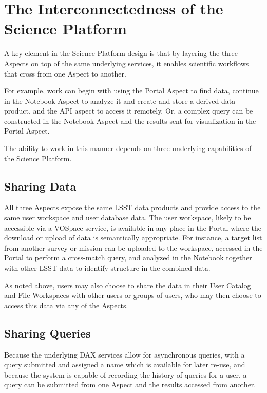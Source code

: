 \section{The Interconnectedness of the Science Platform}\label{interconnectedness-of-the-science-platform}

A key element in the Science Platform design is that by layering the three Aspects on top of the same underlying services, it enables scientific workflows that cross from one Aspect to another.

For example, work can begin with using the Portal Aspect to find data, continue in the Notebook Aspect to analyze it and create and store a derived data product, and the API aspect to access it remotely.
Or, a complex query can be constructed in the Notebook Aspect and the results sent for visualization in the Portal Aspect.

The ability to work in this manner depends on three underlying capabilities of the Science Platform.

\subsection{Sharing Data}\label{sharing-data}

All three Aspects expose the same LSST data products and provide access to the same user workspace and user database data.
The user workspace, likely to be accessible via a VOSpace service, is available in any place in the Portal where the download or upload of data is semantically appropriate.
For instance, a target list from another survey or mission can be uploaded to the workspace, accessed in the Portal to perform a cross-match query, and analyzed in the Notebook together with other LSST data to identify structure in the combined data.

As noted above, users may also choose to share the data in their User Catalog and File Workspaces with other users or groups of users, who may then choose to access this data via any of the Aspects.

\subsection{Sharing Queries}\label{sharing-queries}

Because the underlying DAX services allow for asynchronous queries, with a query submitted and assigned a name which is available for later re-use, and because the system is capable of recording the history of queries for a user, a query can be submitted from one Aspect and the results accessed from another.

